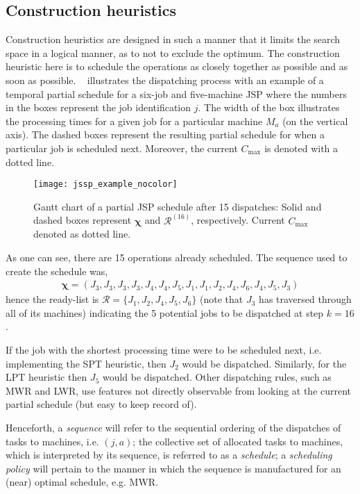 \documentclass[smallextended]{svjour3}
\renewcommand{\vchi}{\bm \chi}
\begin{document}
\subsection{Construction heuristics}\label{sec:constructionjssp}
Construction heuristics are designed in such a manner that it limits the search space in a logical manner, as to not to exclude the optimum. The construction heuristic here is to schedule the operations as closely together as possible and as soon as possible. ~ illustrates the dispatching process with an example of a temporal partial schedule for a six-job and five-machine JSP where the numbers in the boxes represent the job identification $j$. The width of the box illustrates the processing times for a given job for a particular machine $M_a$ (on the vertical axis). The dashed boxes represent the resulting partial schedule for when a particular job is scheduled next. Moreover, the current $C_{\max}$ is denoted with a dotted line.

\begin{figure}[t!]\centering 
\texttt{[image: jssp\_example\_nocolor]}
\caption[Gantt chart of a partial JSP schedule]{Gantt chart of a partial JSP schedule after 15 dispatches: Solid and dashed boxes represent $\vchi$ and $\mathcal{R}^{(16)}$, respectively. Current $C_{\max}$ denoted as dotted line.}
\label{fig:jssp:example}
\end{figure}

As one can see, there are 15 operations already scheduled. The sequence used to create the schedule was,
\begin{eqnarray}
\vchi=\left(J_3,J_3,J_3,J_3,J_4,J_4,J_5,J_1,J_1,J_2,J_4,J_6,J_4,J_5,J_3\right)
\end{eqnarray}
hence the ready-list is $\mathcal{R}=\{J_1,J_2,J_4,J_5,J_6\}$ (note that $J_3$ has traversed through all of its machines) indicating the 5 potential jobs to be dispatched at step $k=16$.

If the job with the shortest processing time were to be scheduled next, i.e. implementing the SPT heuristic, then $J_2$ would be dispatched. Similarly, for the LPT heuristic then $J_5$ would be dispatched. 
Other dispatching rules, such as MWR and LWR, use features not directly observable from looking at the current partial schedule (but easy to keep record of).

Henceforth, a \emph{sequence} will refer to the sequential ordering of the dispatches of tasks to machines, i.e. $(j,a)$; the collective set of allocated tasks to machines, which is interpreted by its sequence, is referred to as a \emph{schedule}; a \emph{scheduling policy} will pertain to the manner in which the sequence is manufactured for an (near) optimal schedule, e.g. MWR.
\end{document}
